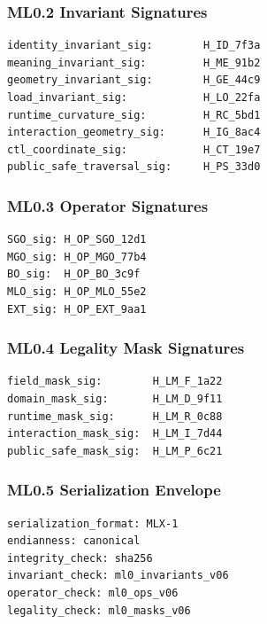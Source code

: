 \subsubsection*{ML0.2 Invariant Signatures}

\begin{verbatim}
identity_invariant_sig:        H_ID_7f3a
meaning_invariant_sig:         H_ME_91b2
geometry_invariant_sig:        H_GE_44c9
load_invariant_sig:            H_LO_22fa
runtime_curvature_sig:         H_RC_5bd1
interaction_geometry_sig:      H_IG_8ac4
ctl_coordinate_sig:            H_CT_19e7
public_safe_traversal_sig:     H_PS_33d0
\end{verbatim}

\subsubsection*{ML0.3 Operator Signatures}

\begin{verbatim}
SGO_sig: H_OP_SGO_12d1
MGO_sig: H_OP_MGO_77b4
BO_sig:  H_OP_BO_3c9f
MLO_sig: H_OP_MLO_55e2
EXT_sig: H_OP_EXT_9aa1
\end{verbatim}

\subsubsection*{ML0.4 Legality Mask Signatures}

\begin{verbatim}
field_mask_sig:        H_LM_F_1a22
domain_mask_sig:       H_LM_D_9f11
runtime_mask_sig:      H_LM_R_0c88
interaction_mask_sig:  H_LM_I_7d44
public_safe_mask_sig:  H_LM_P_6c21
\end{verbatim}

\subsubsection*{ML0.5 Serialization Envelope}

\begin{verbatim}
serialization_format: MLX-1
endianness: canonical
integrity_check: sha256
invariant_check: ml0_invariants_v06
operator_check: ml0_ops_v06
legality_check: ml0_masks_v06
\end{verbatim}


